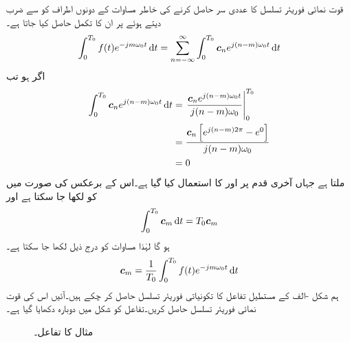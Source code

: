 قوت نمائی فوریئر تسلسل کا عددی سر  حاصل کرنے کی خاطر مساوات  کے دونوں اطراف کو  سے ضرب دیتے ہوئے  پر ان کا تکمل حاصل کیا جاتا ہے۔
\begin{align}\label{مساوات_فوریئر_عددی_سر_قوت_نما_الف}
\int_0^{T_0}f(t)e^{-jm\omega_0 t} \dif t=\sum_{n=-\infty}^{\infty} \int_0^{T_0}\kx{c}_ne^{j(n-m)\omega_0 t} \dif t
\end{align}
اگر  ہو تب
\begin{align*}
\int_0^{T_0} \kx{c}_ne^{j(n-m)\omega_0 t} \dif t&=\left. \frac{\kx{c}_ne^{j(n-m)\omega_0 t}}{j(n-m)\omega_0}\right|_0^{T_0}\\
&=\frac{\kx{c}_n \left[e^{j(n-m)2\pi}-e^{0}\right]}{j(n-m)\omega_0}\\
&=0
\end{align*}
ملتا ہے جہاں آخری قدم پر  اور  کا استعمال کیا گیا ہے۔اس کے برعکس  کی صورت میں  کو  لکھا جا سکتا ہے اور
\begin{align*}
\int_0^{T_0} \kx{c}_m \dif t=T_0 \kx{c}_m
\end{align*}
ہو گا لہٰذا مساوات  کو درج ذیل لکھا جا سکتا ہے۔
\begin{align}\label{مساوات_فوریئر_عددی_سر_قوت_نما_ب}
\kx{c}_m=\frac{1}{T_0} \int_0^{T_0} f(t) e^{-jm\omega_0 t} \dif t
\end{align}
ہم شکل -الف کے مستطیل تفاعل کا تکونیاتی فوریئر تسلسل حاصل کر چکے ہیں۔آئیں اس کی قوت نمائی فوریئر تسلسل حاصل کریں۔تفاعل کو شکل  میں دوبارہ دکھایا گیا ہے۔
\begin{figure}
\centering
{}
\caption{مثال  کا تفاعل۔}
\label{شکل_فوریئر_دندان_دوبارہ}
\end{figure}%


